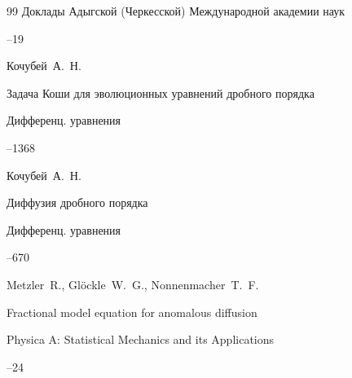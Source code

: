 \begin{thebibliography}{99}
\jour Доклады Адыгской (Черкесской) Международной академии наук




--19





\by Кочубей~А.~Н.

\paper Задача Коши для эволюционных уравнений дробного порядка

\jour Дифференц. уравнения




--1368





\by Кочубей~А.~Н.

\paper Диффузия дробного порядка

\jour Дифференц. уравнения




--670








\by  Metzler~R., Gl\"ockle~W.~G., Nonnenmacher~T.~F.

\paper Fractional model equation for anomalous diffusion

\jour Physica A: Statistical Mechanics and its Applications 




--24








\end{thebibliography}
